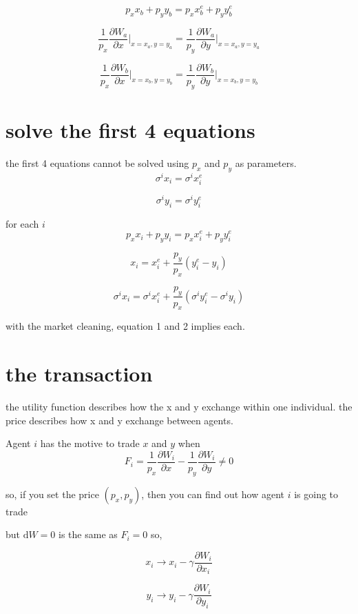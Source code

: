 \documentclass[12pt,a4paper]{article}
\begin{document}
\begin{equation}
p_xx_b+p_yy_b = p_xx_b^e+p_yy_b^e
\end{equation}

\begin{equation}
\frac{1}{p_x}\frac{\partial W_a}{\partial x}\Big |_{x = x_a, y = y_a} = \frac{1}{p_y}\frac{\partial W_a}{\partial y}\Big |_{x = x_a, y = y_a} 
\end{equation}

\begin{equation}
\frac{1}{p_x}\frac{\partial W_b}{\partial x}\Big |_{x = x_b, y = y_b}  = \frac{1}{p_y}\frac{\partial W_b}{\partial y}\Big |_{x = x_b, y = y_b} 
\end{equation}

\section{solve the first 4 equations}
the first 4 equations cannot be solved using $p_x$ and $p_y$ as parameters.
\[
\sigma^ix_i = \sigma^ix_i^e
\]

\[
\sigma^iy_i = \sigma^iy_i^e
\]

for each $i$
\[
p_xx_i+p_yy_i = p_xx_i^e + p_yy_i^e
\]

\[
x_i = x_i^e + \frac{p_y}{p_x}(y_i^e - y_i)
\]

\[
\sigma^ix_i = \sigma^ix_i^e + \frac{p_y}{p_x}(\sigma^iy_i^e - \sigma^iy_i)
\]

with the market cleaning, equation 1 and 2 implies each. 

\section{the transaction}
the utility function describes how the x and y exchange within one individual.
the price describes how x and y exchange between agents.

Agent $i$ has the motive to trade $x$ and $y$ when
\[
	F_i = \frac{1}{p_x}\frac{\partial W_i}{\partial x} - \frac{1}{p_y}\frac{\partial W_i}{\partial y} \neq 0
\]

so, if you set the price $(p_x,p_y)$, then you can find out how agent $i$ is going to trade



but $\mathrm{d}W = 0$ is the same as $F_i = 0$ so,

\[
x_i \rightarrow x_i - \gamma\frac{\partial W_i}{\partial x_i}
\]

\[
y_i \rightarrow y_i - \gamma\frac{\partial W_i}{\partial y_i}
\]
\end{document}

